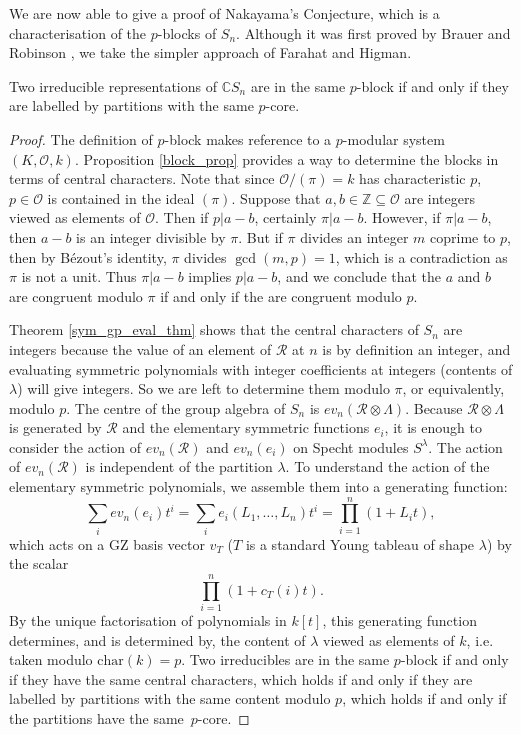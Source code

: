 We are now able to give a proof of Nakayama's Conjecture, which is a characterisation of the $p$-blocks of $S_n$. Although it was first proved by Brauer and Robinson \cite{BrauerRobinson}, we take the simpler approach of Farahat and Higman.
\begin{theorem} \label{nakayama_conjecture}
Two irreducible representations of $\mathbb{C}S_n$ are in the same $p$-block if and only if they are labelled by partitions with the same $p$-core.
\end{theorem}
\begin{proof}
The definition of $p$-block makes reference to a $p$-modular system $(K, \mathcal{O}, k)$. Proposition \ref{block_prop} provides a way to determine the blocks in terms of central characters. Note that since $\mathcal{O}/(\pi) = k$ has characteristic $p$, $p \in \mathcal{O}$ is contained in the ideal $(\pi)$. Suppose that $a, b \in \mathbb{Z} \subseteq \mathcal{O}$ are integers viewed as elements of $\mathcal{O}$. Then if $p | a-b$, certainly $\pi | a-b$. However, if $\pi | a-b$, then $a-b$ is an integer divisible by $\pi$. But if $\pi$ divides an integer $m$ coprime to $p$, then by B\'{e}zout's identity, $\pi$ divides $\gcd(m,p)=1$, which is a contradiction as $\pi$ is not a unit. Thus $\pi | a-b$ implies $p | a-b$, and we conclude that the $a$ and $b$ are congruent modulo $\pi$ if and only if the are congruent modulo $p$.

Theorem \ref{sym_gp_eval_thm} shows that the central characters of $S_n$ are integers because the value of an element of $\mathcal{R}$ at $n$ is by definition an integer, and evaluating symmetric polynomials with integer coefficients at integers (contents of $\lambda$) will give integers. So we are left to determine them modulo $\pi$, or equivalently, modulo $p$. The centre of the group algebra of $S_n$ is $ev_n(\mathcal{R} \otimes \Lambda)$. Because $\mathcal{R} \otimes \Lambda$ is generated by $\mathcal{R}$ and the elementary symmetric functions $e_i$, it is enough to consider the action of $ev_n(\mathcal{R})$ and $ev_n(e_i)$ on Specht modules $S^\lambda$. The action of $ev_n(\mathcal{R})$ is independent of the partition $\lambda$. To understand the action of the elementary symmetric polynomials, we assemble them into a generating function:
\[
\sum_i ev_n(e_i) t^i = 
\sum_i e_i(L_1, \ldots, L_n)t^i = \prod_{i=1}^n (1 + L_i t),
\]
which acts on a GZ basis vector $v_T$ ($T$ is a standard Young tableau of shape $\lambda$) by the scalar
\[
\prod_{i=1}^n (1 + c_T(i) t).
\]
By the unique factorisation of polynomials in $k[t]$, this generating function determines, and is determined by, the content of $\lambda$ viewed as elements of $k$, i.e. taken modulo $\mathrm{char}(k)=p$. Two irreducibles are in the same $p$-block if and only if they have the same central characters, which holds if and only if they are labelled by partitions with the same content modulo $p$, which holds if and only if the partitions have the same~$p$-core. 
\end{proof}




